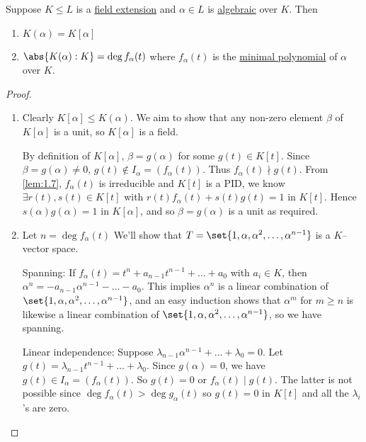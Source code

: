 \documentclass{article}
\begin{document}

\begin{nthm}\label{thm:1.9}
    Suppose $K \leq L$ is a \hyperlink{def:fieldExt}{field extension} and $\alpha \in L$ is \hyperlink{def:algebraic}{algebraic} over $K$.  Then
    \begin{enumerate}[label=(\roman*)]
        \item  $K(\alpha) = K[\alpha]$
        \item $\abs{K(\alpha) : K} = \deg f_\alpha(t)$ where $f_\alpha(t)$ is the \hyperlink{def:minimalPoly}{minimal polynomial} of $\alpha$ over $K$.
    \end{enumerate}
\end{nthm}

\begin{proof}
    \leavevmode
    \begin{enumerate}[label=(\roman*)]
        \item Clearly $K[\alpha] \leq K(\alpha)$. We aim to show that any non-zero element $\beta$ of $K[\alpha]$ is a unit, so $K[\alpha]$ is a field.

            By definition of $K[\alpha]$, $\beta = g(\alpha)$ for some $g(t) \in K[t]$.  Since $\beta = g(\alpha) \neq 0$, $g(t) \notin I_\alpha = (f_\alpha(t))$.  Thus $f_\alpha(t) \nmid g(t)$.
            From \cref{lem:1.7}, $f_\alpha(t)$ is irreducible and $K[t]$ is a PID, we know $\exists r(t), s(t) \in K[t]$ with $r(t) f_\alpha(t) + s(t) g(t) = 1$ in $K[t]$.
            Hence $s(\alpha) g(\alpha) = 1$ in $K[\alpha]$, and so $\beta = g(\alpha)$ is a unit as required.
        \item Let $n = \deg f_\alpha(t)$ We'll show that $T = \set{1, \alpha, \alpha^2, \dotsc, \alpha^{n-1}}$ is a $K$--vector space.

            Spanning: If $f_\alpha(t) = t^n + a_{n-1} t^{n-1} + \dots + a_0$ with $a_i \in K$, then $\alpha^n = -a_{n-1} \alpha^{n-1} - \dots - a_0$.
            This implies $\alpha^n$ is a linear combination of $\set{1, \alpha, \alpha^2, \dotsc, \alpha^{n-1}}$, and an easy induction shows that $\alpha^m$ for $m \geq n$ is likewise a linear combination of $\set{1, \alpha, \alpha^2, \dotsc, \alpha^{n-1}}$, so we have spanning.

            Linear independence: Suppose $\lambda_{n-1} \alpha^{n-1} + \dotsc + \lambda_0 = 0$.
            Let $g(t) = \lambda_{n-1} t^{n-1} + \dotsc + \lambda_0$.  Since $g(\alpha) = 0$, we have $g(t) \in I_\alpha = (f_\alpha(t)).$  So $g(t) = 0$ or $f_\alpha(t) \mid g(t)$.
            The latter is not possible since $\deg f_\alpha(t) > \deg g_\alpha(t)$ so $g(t) = 0$ in $K[t]$ and all the $\lambda_i$'s are zero.
    \end{enumerate}
\end{proof}
\end{document}
